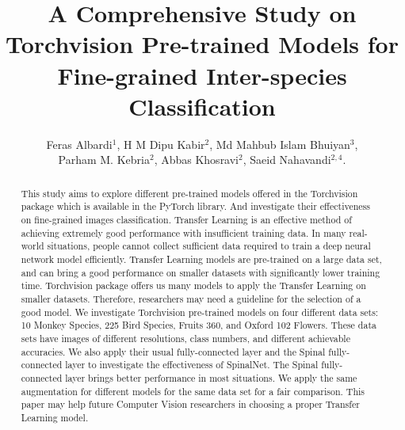 \documentclass[conference]{IEEEtran}
\begin{document}
\title{\vspace{0.25in}A Comprehensive Study on Torchvision Pre-trained Models for Fine-grained Inter-species Classification}
\author{Feras Albardi$^1$, H M Dipu Kabir$^2$, Md Mahbub Islam Bhuiyan$^3$,\\ Parham M. Kebria$^2$, Abbas Khosravi$^2$,  Saeid Nahavandi$^{2,4}$.  \\







}













\maketitle


\begin{abstract}
This study aims to explore different pre-trained models offered in the Torchvision package which is available in the PyTorch library. And investigate their effectiveness on fine-grained images classification. Transfer Learning is an effective method of achieving extremely good performance with insufficient training data. In many real-world situations, people cannot collect sufficient data required to train a deep neural network model efficiently. Transfer Learning models are pre-trained on a large data set, and can bring a good performance on smaller datasets with significantly lower training time. Torchvision package offers us many models to apply the Transfer Learning on smaller datasets. Therefore, researchers may need a guideline for the selection of a good model. We investigate Torchvision pre-trained models on four different data sets: 10 Monkey Species, 225 Bird Species, Fruits 360, and Oxford 102 Flowers. These data sets have images of different resolutions, class numbers, and different achievable accuracies. We also apply their usual fully-connected layer and the Spinal fully-connected layer to investigate the effectiveness of SpinalNet. The Spinal fully-connected layer brings better performance in most situations. We apply the same augmentation for different models for the same data set for a fair comparison. This paper may help future Computer Vision researchers in choosing a proper Transfer Learning model.
\end{abstract}
\end{document}
